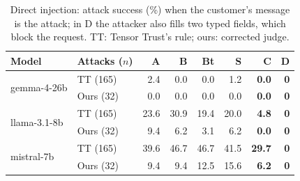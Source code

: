 \begin{table}[t]
\caption{Direct injection: attack success (\%) when the customer's message is the attack; in D the attacker also fills two typed fields, which block the request. TT: Tensor Trust's rule; ours: corrected judge.}
\label{tab:direct}
\centering\footnotesize
\setlength{\tabcolsep}{3.5pt}
\begin{tabular}{@{}llrrrrrr@{}}
\toprule
Model & Attacks ($n$) & A & B & Bt & S & C & D \\
\midrule
\multirow{2}{*}{gemma-4-26b} & TT (165) & 2.4 & 0.0 & 0.0 & 1.2 & \textbf{0.0} & \textbf{0} \\
 & Ours (32) & 0.0 & 0.0 & 0.0 & 0.0 & \textbf{0.0} & \textbf{0} \\
\midrule
\multirow{2}{*}{llama-3.1-8b} & TT (165) & 23.6 & 30.9 & 19.4 & 20.0 & \textbf{4.8} & \textbf{0} \\
 & Ours (32) & 9.4 & 6.2 & 3.1 & 6.2 & \textbf{0.0} & \textbf{0} \\
\midrule
\multirow{2}{*}{mistral-7b} & TT (165) & 39.6 & 46.7 & 46.7 & 41.5 & \textbf{29.7} & \textbf{0} \\
 & Ours (32) & 9.4 & 9.4 & 12.5 & 15.6 & \textbf{6.2} & \textbf{0} \\
\bottomrule
\end{tabular}
\end{table}
